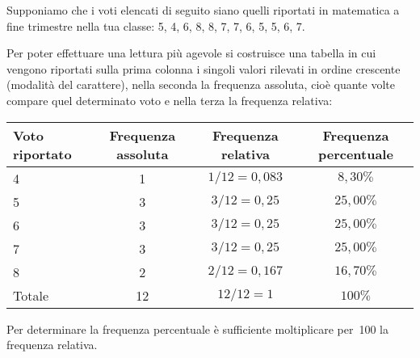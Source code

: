  \begin{esempio}

Supponiamo che i voti elencati di seguito siano quelli riportati in 
matematica a fine trimestre
nella tua classe: 5, 4, 6, 8, 8, 7, 7, 6, 5, 5, 6, 7.

Per poter effettuare una lettura più agevole si costruisce una tabella in 
cui vengono riportati sulla prima colonna i singoli valori rilevati in 
ordine crescente (modalità del carattere),
nella seconda la frequenza assoluta, cioè quante volte compare quel 
determinato voto e nella terza la frequenza relativa:

\begin{center}
\begin{tabular}{lccc}
\toprule
Voto riportato & Frequenza assoluta & Frequenza relativa & Frequenza 
percentuale \\
\midrule
4 & 1 & \(1/12=0,083\) & \(8,30\%\) \\
5 & 3 & \(3/12=0,25\) & \(25,00\%\) \\
6 & 3 & \(3/12=0,25\) & \(25,00\%\) \\
7 & 3 & \(3/12=0,25\) & \(25,00\%\) \\
8 & 2 & \(2/12=0,167\) & \(16,70\%\) \\
Totale & 12 & \(12/12=1\) & \(100\%\) \\
\bottomrule
\end{tabular}
\end{center}

Per determinare la frequenza percentuale è sufficiente moltiplicare per~100 
la frequenza relativa.
 \end{esempio}

